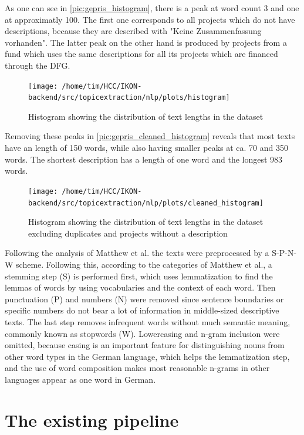 As one can see in \autoref{pic:gepris_histogram}, there is a peak at word count 3 and one at approximatly 100. The first one corresponds to all projects which do not have descriptions, because they are described with "Keine Zusammenfassung vorhanden". The latter peak on the other hand is produced by projects from a fund which uses the same descriptions for all its projects which are financed through the DFG.

\begin{figure}[htbp!]
	\centering
	\texttt{[image: /home/tim/HCC/IKON-backend/src/topicextraction/nlp/plots/histogram]}
	\caption{\label{pic:gepris_histogram} Histogram showing the distribution of text lengths in the dataset}
\end{figure}

Removing these peaks in \autoref{pic:gepris_cleaned_histogram} reveals that most texts have an length of 150 words, while also having smaller peaks at ca. 70 and 350 words. The shortest description has a length of one word and the longest  983 words.

\begin{figure}[htpb!]
	\centering
	\texttt{[image: /home/tim/HCC/IKON-backend/src/topicextraction/nlp/plots/cleaned\_histogram]}
	\caption{\label{pic:gepris_cleaned_histogram} Histogram showing the distribution of text lengths in the dataset excluding duplicates and projects without a description}
\end{figure}

Following the analysis of Matthew et al. \cite{dennymatthewpennstateuniversity;spirlingarthurnewyorkuniversityReplicationDataText2017} the texts were preprocessed by a S-P-N-W scheme. 
Following this, according to the categories of Matthew et al., a stemming step (S) is performed first, which uses lemmatization to find the lemmas of words by using vocabularies and the context of each word.
Then punctuation (P) and numbers (N) were removed since sentence boundaries or specific numbers do not bear a lot of information in middle-sized descriptive texts. The last step removes infrequent words without much semantic meaning, commonly known as stopwords (W). Lowercasing and n-gram inclusion were omitted, because casing is an important feature for distinguishing nouns from other word types in the German language, which helps the lemmatization step, and the use of word composition makes most reasonable n-grams in other languages appear as one word in German. 

\section{The existing pipeline}


